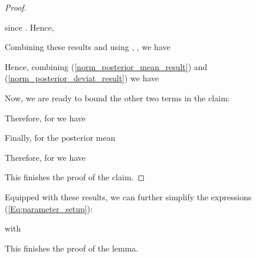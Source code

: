 \documentclass[jair,twoside,11pt,theapa]{article}
\theoremstyle{definition}
\begin{document}
\begin{proof}
\begin{enumerate}
    since . Hence,
    
\end{enumerate}
Combining these results and using ,  , we have

Hence, combining (\ref{norm_posterior_mean_result}) and (\ref{norm_posterior_deviat_result})  we have

Now, we are ready to bound the other two terms in the claim:

Therefore, for  we have

Finally, for the posterior mean

Therefore, for  we have

This finishes the proof of the claim.
\end{proof}

\noindent Equipped with these results, we can further simplify the expressions (\ref{Eq:parameter_setup}):

with

This finishes the proof of the lemma. \\
\end{document}
